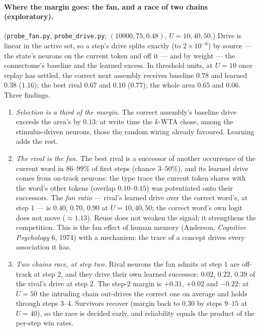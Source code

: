 \documentclass[11pt]{article}
\theoremstyle{definition}
\theoremstyle{plain}
\begin{document}
\paragraph{Where the margin goes: the fan, and a race of two chains
(exploratory).} (\texttt{probe\_fan.py}, \texttt{probe\_drive.py}; $(10000,75,0.48)$,
$U = 10, 40, 50$.) Drive is linear in the active set, so a step's drive splits
exactly (to $2\times10^{-6}$) by source --- the state's neurons on the current
token and off it --- and by weight --- the connectome's baseline and the learned
excess. In threshold units, at $U = 10$ once replay has settled, the correct
next assembly receives baseline $0.78$ and learned $0.38$ ($1.16$); the best rival
$0.67$ and $0.10$ ($0.77$); the whole area $0.65$ and $0.06$. Three findings.
\begin{enumerate}
\item \emph{Selection is a third of the margin.} The correct assembly's baseline
drive exceeds the area's by $0.13$: at write time the $k$-WTA chose, among the
stimulus-driven neurons, those the random wiring already favoured. Learning
adds the rest.
\item \emph{The rival is the fan.} The best rival is a successor of another
occurrence of the current word in $86$--$99\%$ of first steps (chance
$3$--$50\%$), and its learned drive comes from on-track neurons: the type trace
the current token shares with the word's other tokens (overlap $0.10$--$0.15$)
was potentiated onto their successors. The \emph{fan ratio} --- rival's
learned drive over the correct word's, at step $1$ --- is $0.40$, $0.70$, $0.90$
at $U = 10, 40, 50$; the correct word's own logit does not move ($\approx 1.13$).
Reuse does not weaken the signal; it strengthens the competition. This is the
fan effect of human memory (Anderson, \emph{Cognitive Psychology} 6, 1974) with a
mechanism: the trace of a concept drives every association it has.
\item \emph{Two chains race, at step two.} Rival neurons the fan admits at step
$1$ are off-track at step $2$, and they drive their own learned successor:
$0.02$, $0.22$, $0.39$ of the rival's drive at step $2$. The step-$2$ margin is
$+0.31$, $+0.02$ and $-0.22$: at $U = 50$ the intruding chain out-drives the
correct one on average and holds through steps $3$--$4$. Survivors recover
(margin back to $0.30$ by steps $9$--$15$ at $U = 40$), so the race is decided early,
and reliability equals the product of the per-step win rates.
\end{enumerate}
\end{document}
